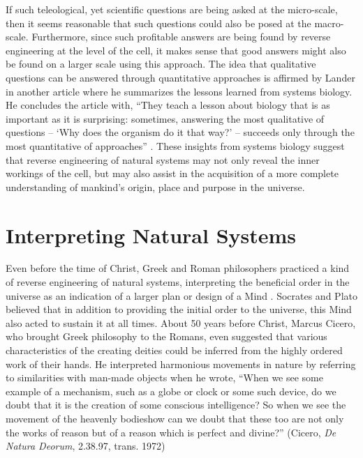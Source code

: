If such teleological, yet scientific questions are being asked at the
micro-scale, then it seems reasonable that such questions could also be
posed at the macro-scale. Furthermore, since such profitable answers
are being found by reverse engineering at the level of the cell, it
makes sense that good answers might also be found on a larger scale
using this approach. The idea that qualitative questions can be
answered through quantitative approaches is affirmed by Lander in
another article where he summarizes the lessons learned from systems
biology. He concludes the article with, ``They teach a lesson about
biology that is as important as it is surprising: sometimes, answering
the most qualitative of questions – `Why does the organism do it that
way?' – succeeds only through the most quantitative of
approaches'' \citep{lander2007}. These insights from systems biology
suggest that reverse engineering of natural systems may not only reveal
the inner workings of the cell, but may also assist in the acquisition
of a more complete understanding of mankind’s origin, place and purpose
in the universe.

\section{Interpreting Natural Systems}

Even before the time of Christ, Greek and Roman philosophers practiced a
kind of reverse engineering of natural systems, interpreting the
beneficial order in the universe as an indication of a larger plan or
design of a Mind \citep{sedley2009}. Socrates and Plato believed that
in addition to providing the initial order to the universe, this Mind
also acted to sustain it at all times. About 50 years before Christ,
Marcus Cicero, who brought Greek philosophy to the Romans, even
suggested that various characteristics of the creating deities could be
inferred from the highly ordered work of their hands. He interpreted
harmonious movements in nature by referring to similarities with
man-made objects when he wrote, “When we see some example of a
mechanism, such as a globe or clock or some such device, do we doubt
that it is the creation of some conscious intelligence? So when we see
the movement of the heavenly bodies{\jdots}how can we doubt that these too are
not only the works of reason but of a reason which is perfect and
divine?” (Cicero, \textit{De Natura Deorum}, 2.38.97, trans. 1972) %

